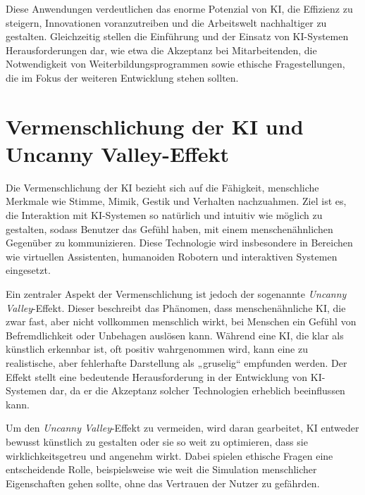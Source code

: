 \documentclass[a4paper,12pt]{article}
\begin{document}
Diese Anwendungen verdeutlichen das enorme Potenzial von KI, die Effizienz zu steigern, Innovationen voranzutreiben und die Arbeitswelt nachhaltiger zu gestalten. Gleichzeitig stellen die Einführung und der Einsatz von KI-Systemen Herausforderungen dar, wie etwa die Akzeptanz bei Mitarbeitenden, die Notwendigkeit von Weiterbildungsprogrammen sowie ethische Fragestellungen, die im Fokus der weiteren Entwicklung stehen sollten.


\section{Vermenschlichung der KI und Uncanny Valley-Effekt}

Die Vermenschlichung der KI bezieht sich auf die Fähigkeit, menschliche Merkmale wie Stimme, Mimik, Gestik und Verhalten nachzuahmen. Ziel ist es, die Interaktion mit KI-Systemen so natürlich und intuitiv wie möglich zu gestalten, sodass Benutzer das Gefühl haben, mit einem menschenähnlichen Gegenüber zu kommunizieren. Diese Technologie wird insbesondere in Bereichen wie virtuellen Assistenten, humanoiden Robotern und interaktiven Systemen eingesetzt.

Ein zentraler Aspekt der Vermenschlichung ist jedoch der sogenannte \textit{Uncanny Valley}-Effekt. Dieser beschreibt das Phänomen, dass menschenähnliche KI, die zwar fast, aber nicht vollkommen menschlich wirkt, bei Menschen ein Gefühl von Befremdlichkeit oder Unbehagen auslösen kann. Während eine KI, die klar als künstlich erkennbar ist, oft positiv wahrgenommen wird, kann eine zu realistische, aber fehlerhafte Darstellung als „gruselig“ empfunden werden. Der Effekt stellt eine bedeutende Herausforderung in der Entwicklung von KI-Systemen dar, da er die Akzeptanz solcher Technologien erheblich beeinflussen kann.

Um den \textit{Uncanny Valley}-Effekt zu vermeiden, wird daran gearbeitet, KI entweder bewusst künstlich zu gestalten oder sie so weit zu optimieren, dass sie wirklichkeitsgetreu und angenehm wirkt. Dabei spielen ethische Fragen eine entscheidende Rolle, beispielsweise wie weit die Simulation menschlicher Eigenschaften gehen sollte, ohne das Vertrauen der Nutzer zu gefährden.
\end{document}
